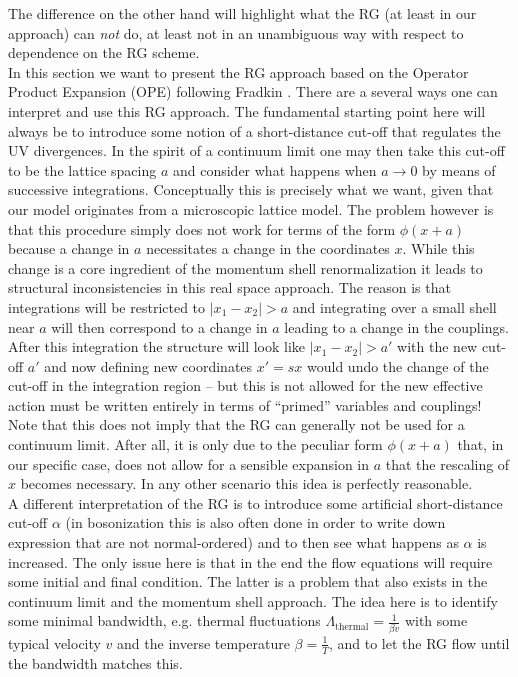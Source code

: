 \documentclass[english, parskip=full]{scrartcl}
\begin{document}
The difference on the other hand will highlight what the RG (at least in our approach) can \emph{not} do, at least not in an unambiguous way with respect to dependence on the RG scheme.\\
In this section we want to present the RG approach based on the Operator Product Expansion (OPE) following Fradkin .
There are a several ways one can interpret and use this RG approach.
The fundamental starting point here will always be to introduce some notion of a short-distance cut-off that regulates the UV divergences.
In the spirit of a continuum limit one may then take this cut-off to be the lattice spacing $a$ and consider what happens when $a\rightarrow 0$ by means of successive integrations.
Conceptually this is precisely what we want, given that our model originates from a microscopic lattice model.
The problem however is that this procedure simply does not work for terms of the form $\phi(x+a)$ because a change in $a$ necessitates a change in the coordinates $x$.
While this change is a core ingredient of the momentum shell renormalization it leads to structural inconsistencies in this real space approach.
The reason is that integrations will be restricted to $|x_1-x_2|>a$ and integrating over a small shell near $a$ will then correspond to a change in $a$ leading to a change in the couplings.
After this integration the structure will look like $|x_1-x_2|>a'$ with the new cut-off $a'$ and now defining new coordinates $x'=sx$ would undo the change of the cut-off in the integration region -- but this is not allowed for the new effective action must be written entirely in terms of ``primed'' variables and couplings!
Note that this does not imply that the RG can generally not be used for a continuum limit.
After all, it is only due to the peculiar form $\phi(x+a)$ that, in our specific case, does not allow for a sensible expansion in $a$ that the rescaling of $x$ becomes necessary.
In any other scenario this idea is perfectly reasonable.\\
A different interpretation of the RG is to introduce some artificial short-distance cut-off $\alpha$ (in bosonization this is also often done in order to write down expression that are not normal-ordered) and to then see what happens as $\alpha$ is increased.
The only issue here is that in the end the flow equations will require some initial and final condition.
The latter is a problem that also exists in the continuum limit and the momentum shell approach.
The idea here is to identify some minimal bandwidth, e.g. thermal fluctuations $\Lambda_\text{thermal} = \frac{1}{\beta v}$ with some typical velocity $v$ and the inverse temperature $\beta=\frac{1}{T}$, and to let the RG flow until the bandwidth matches this.\\
\end{document}
